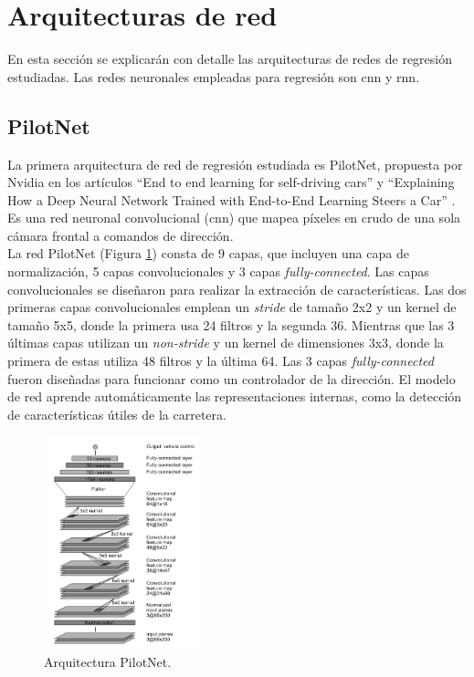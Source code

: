 \section{Arquitecturas de red}\label{arquitecturas_reg}

En esta sección se explicarán con detalle las arquitecturas de redes de regresión estudiadas. Las redes neuronales empleadas para regresión son \acrshort{cnn} y \acrshort{rnn}.


\subsection{PilotNet}

La primera arquitectura de red de regresión estudiada es PilotNet, propuesta por Nvidia en los artículos ``End to end learning for self-driving cars'' \cite{end2end} y ``Explaining How a Deep Neural Network Trained with End-to-End Learning Steers a Car'' \cite{explaining-end2end}. Es una red neuronal convolucional (\acrshort{cnn}) que mapea píxeles en crudo de una sola cámara frontal a comandos de dirección.\\


La red PilotNet (Figura \ref{fig.Pilotnet}) consta de 9 capas, que incluyen una capa de normalización, 5 capas convolucionales y 3 capas \textit{fully-connected}. Las capas convolucionales se diseñaron para realizar la extracción de características. Las dos primeras capas convolucionales emplean un \textit{stride} de tamaño 2x2 y un kernel de tamaño 5x5, donde la primera usa 24 filtros y la segunda 36. Mientras que las 3 últimas capas utilizan un \textit{non-stride} y un kernel de dimensiones 3x3, donde la primera de estas utiliza 48 filtros y la última 64. Las 3 capas \textit{fully-connected} fueron diseñadas para funcionar como un controlador de la dirección. El modelo de red aprende automáticamente las representaciones internas, como la detección de características útiles de la carretera.

\begin{figure}
\begin{center}
	\includegraphics[width=0.4\textwidth]{figures/Regresion/pilotnet.png}
   \caption{Arquitectura PilotNet.}
	\label{fig.Pilotnet}
\end{center}
\end{figure}



